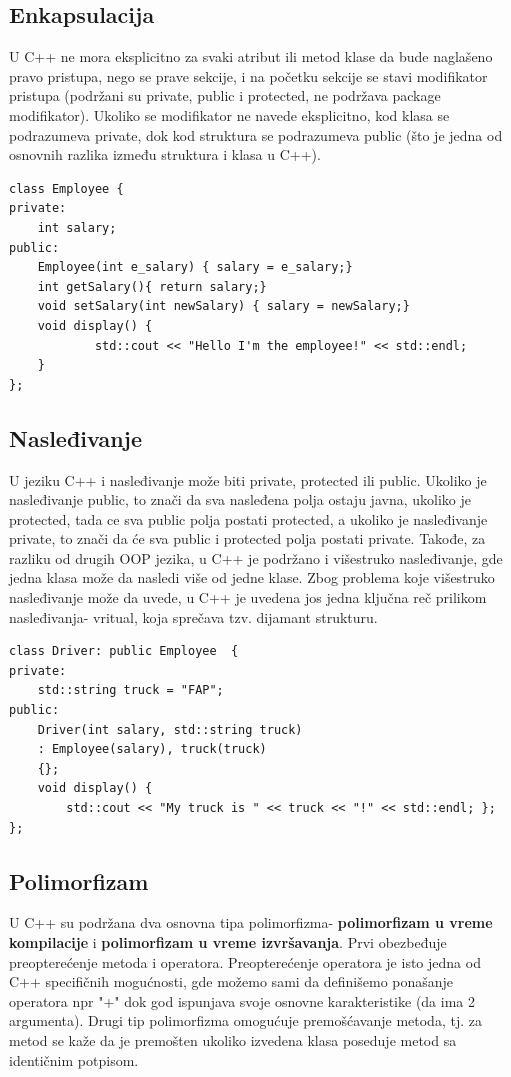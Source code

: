 \documentclass[a4paper]{article}
\begin{document}
{\subsection{Enkapsulacija}
\label{subsec:c++Enkapsulacija}
U C++ ne mora eksplicitno za svaki atribut ili metod klase da bude naglašeno pravo pristupa, nego se prave sekcije, i na početku sekcije se stavi modifikator pristupa (podržani su private, public i protected, ne podržava package modifikator). Ukoliko se modifikator ne navede eksplicitno, kod klasa se podrazumeva private, dok kod struktura se podrazumeva public (što je jedna od osnovnih razlika između struktura i klasa u C++).
\begin{lstlisting}[caption={Primer deklarisanja klase sa enkapsulacijom},frame=single, label=lst:c++Deklaracija]
class Employee {
private:
	int salary;
public: 
	Employee(int e_salary) { salary = e_salary;}
	int getSalary(){ return salary;}
	void setSalary(int newSalary) { salary = newSalary;}
	void display() {
     		std::cout << "Hello I'm the employee!" << std::endl;
	}
};
\end{lstlisting}
\subsection{Nasleđivanje}
\label{subsec:c++Nasledjivanje}
U jeziku C++ i nasleđivanje može biti private, protected ili public. Ukoliko je nasleđivanje public, to znači da sva nasleđena polja ostaju javna, ukoliko je protected, tada ce sva public polja postati protected, a ukoliko je nasleđivanje private, to znači da će sva public i protected polja postati private. Takođe, za razliku od drugih OOP jezika, u C++ je podržano i višestruko nasleđivanje, gde jedna klasa može da nasledi više od jedne klase. Zbog problema koje višestruko nasleđivanje može da uvede, u C++ je uvedena jos jedna ključna reč prilikom nasleđivanja- vritual, koja sprečava tzv. dijamant strukturu. 
\begin{lstlisting}[caption={Primer nasleđivanja klasa u C++},frame=single, label=lst:c++Nasledjivanje]
class Driver: public Employee  {
private:
  	std::string truck = "FAP";
public: 
   	Driver(int salary, std::string truck) 
	: Employee(salary), truck(truck) 
	{};
  	void display() {
		std::cout << "My truck is " << truck << "!" << std::endl; };
};
\end{lstlisting}
\subsection{Polimorfizam}
\label{subsec:c++Polimorfizam}
U C++ su podržana dva osnovna tipa polimorfizma- \textbf{polimorfizam u vreme kompilacije} i \textbf{polimorfizam u vreme izvršavanja}. Prvi obezbeđuje preopterećenje metoda i operatora. Preopterećenje operatora je isto jedna od C++ specifičnih mogućnosti, gde možemo sami da definišemo ponašanje operatora npr "+" dok god ispunjava svoje osnovne karakteristike (da ima 2 argumenta). Drugi tip polimorfizma omogućuje premošćavanje metoda, tj. za metod se kaže da je premošten ukoliko izvedena klasa poseduje metod sa identičnim potpisom. 
}
\end{document}
